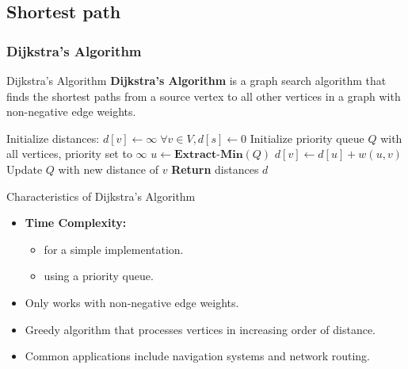 \newpage
\subsection{Shortest path}
\subsubsection{Dijkstra's Algorithm}
\begin{definition}[]{Dijkstra's Algorithm}
    \textbf{Dijkstra's Algorithm} is a graph search algorithm that finds the shortest paths from a source vertex to all other vertices in a graph with non-negative edge weights.
\end{definition}

\begin{algorithm}
    \caption{Dijkstra's Algorithm}
    \begin{algorithmic}[1]
         
            \State Initialize distances: $d[v] \gets \infty \; \forall v \in V, d[s] \gets 0$
            \State Initialize priority queue $Q$ with all vertices, priority set to $\infty$
                \State $u \gets \textbf{Extract-Min}(Q)$
                     
                        \State $d[v] \gets d[u] + w(u, v)$
                        \State Update $Q$ with new distance of $v$
                    \EndIf
                \EndFor
            \EndWhile
            \State \textbf{Return} distances $d$
        \EndProcedure
    \end{algorithmic}
\end{algorithm}

\begin{properties}[]{Characteristics of Dijkstra's Algorithm}
    \begin{itemize}
        \item \textbf{Time Complexity:}
              \begin{itemize}
                  \item {} for a simple implementation.
                  \item {} using a priority queue.
              \end{itemize}
        \item Only works with non-negative edge weights.
        \item Greedy algorithm that processes vertices in increasing order of distance.
        \item Common applications include navigation systems and network routing.
    \end{itemize}
\end{properties}

